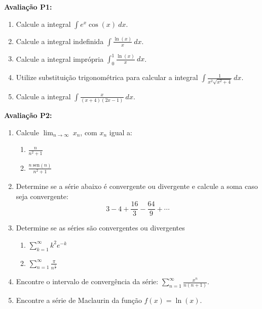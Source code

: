 \documentclass[a4paper,5pt]{amsbook}
\newcommand{\sen}{\text{sen}}
\newcommand{\ds}{\displaystyle}
\begin{document}
\vspace{0.2cm}
\textbf{Avalia\c{c}\~ao P1:}
\begin{enumerate}
\item Calcule a integral $\displaystyle\int e^x \cos(x)\ dx$.

\item Calcule a integral indefinida $\displaystyle\int \frac{\ln(x)}{x}\ dx$.

\item Calcule a integral impr\'opria $\displaystyle\int_0^1 \frac{\ln(x)}{x}\ dx$.

\item Utilize substitui\c{c}\~ao trigonom\'etrica para calcular a integral
	$\displaystyle\int \frac{1}{x^2 \sqrt{x^2+4}}\ dx$.

\item Calcule a integral $\ds\int \frac{x}{(x+4)(2x-1)}\ dx$.

\end{enumerate}

\textbf{Avalia\c{c}\~ao P2:}
\begin{enumerate}
\item Calcule $\displaystyle\lim_{n\rightarrow\infty}\ x_n$, com $x_n$ igual a:
	\begin{enumerate}
		\item $\ds\frac{n}{n^2+1}$
		\item $\ds\frac{n\ \sen(n)}{n^2+1}$
	\end{enumerate}

\item Determine se a s\'erie abaixo \'e convergente ou divergente e calcule a soma
	caso seja convergente:
$$\ds3-4+\frac{16}{3}-\frac{64}{9}+\cdots$$

\item Determine se as s\'eries s\~ao convergentes ou divergentes
	\begin{enumerate}
		\item $\ds\sum_{k=1}^\infty k^2 e^{-k}$
		\item $\ds\sum_{n=1}^\infty \frac{\pi}{n^{{\frac{1}{\pi}}}}$
	\end{enumerate}

\item Encontre o intervalo de converg\^encia da s\'erie: $\ds \sum_{n=1}^\infty
	\frac{x^n}{n(n+1)}$.

\item Encontre a s\'erie de Maclaurin da fun\c{c}\~ao $f(x) = \ln(x)$.
\end{enumerate}
\end{document}
